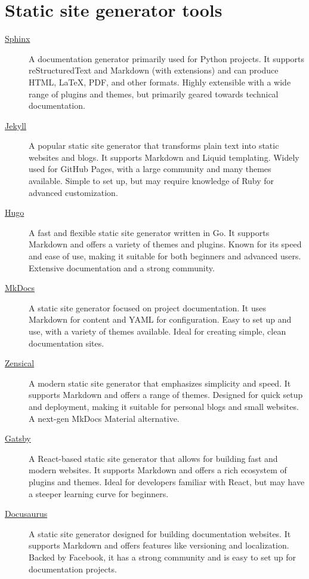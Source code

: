 \documentclass[a4paper,twoside]{article}
\begin{document}
\section{Static site generator tools}
\begin{description}
\item[{\href{https://www.sphinx-doc.org/en/master/}{Sphinx}}] A documentation generator primarily used for Python projects. It supports reStructuredText and Markdown (with extensions) and can produce HTML, \LaTeX{}, PDF, and other formats. Highly extensible with a wide range of plugins and themes, but primarily geared towards technical documentation.
\item[{\href{https://jekyllrb.com/}{Jekyll}}] A popular static site generator that transforms plain text into static websites and blogs. It supports Markdown and Liquid templating. Widely used for GitHub Pages, with a large community and many themes available. Simple to set up, but may require knowledge of Ruby for advanced customization.
\item[{\href{https://gohugo.io/}{Hugo}}] A fast and flexible static site generator written in Go. It supports Markdown and offers a variety of themes and plugins. Known for its speed and ease of use, making it suitable for both beginners and advanced users. Extensive documentation and a strong community.
\item[{\href{https://www.mkdocs.org/}{MkDocs}}] A static site generator focused on project documentation. It uses Markdown for content and YAML for configuration. Easy to set up and use, with a variety of themes available. Ideal for creating simple, clean documentation sites.
\item[{\href{https://www.zensical.com/}{Zensical}}] A modern static site generator that emphasizes simplicity and speed. It supports Markdown and offers a range of themes. Designed for quick setup and deployment, making it suitable for personal blogs and small websites. A next-gen MkDocs Material alternative.
\item[{\href{https://www.gatsbyjs.com/}{Gatsby}}] A React-based static site generator that allows for building fast and modern websites. It supports Markdown and offers a rich ecosystem of plugins and themes. Ideal for developers familiar with React, but may have a steeper learning curve for beginners.
\item[{\href{https://docusaurus.io/}{Docusaurus}}] A static site generator designed for building documentation websites. It supports Markdown and offers features like versioning and localization. Backed by Facebook, it has a strong community and is easy to set up for documentation projects.

\end{description}
\end{document}
